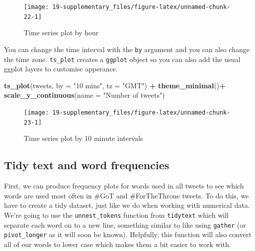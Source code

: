\documentclass[]{book}
\newenvironment{Shaded}{\begin{snugshade}}{\end{snugshade}}
\newcommand{\DataTypeTok}[1]{\textcolor[rgb]{0.13,0.29,0.53}{#1}}
\newcommand{\KeywordTok}[1]{\textcolor[rgb]{0.13,0.29,0.53}{\textbf{#1}}}
\newcommand{\NormalTok}[1]{#1}
\newcommand{\OperatorTok}[1]{\textcolor[rgb]{0.81,0.36,0.00}{\textbf{#1}}}
\newcommand{\StringTok}[1]{\textcolor[rgb]{0.31,0.60,0.02}{#1}}
\begin{document}
\begin{figure}

{\centering \texttt{[image: 19-supplementary\_files/figure-latex/unnamed-chunk-22-1]} 

}

\caption{Time series plot by hour}\label{fig:unnamed-chunk-22}
\end{figure}

You can change the time interval with the \texttt{by} argument and you can also change the time zone. \texttt{ts\_plot} creates a \texttt{ggplot} object so you can also add the usual ggplot layers to customise apperance.

\begin{Shaded}
\begin{Highlighting}[]
\KeywordTok{ts_plot}\NormalTok{(tweets, }\DataTypeTok{by =} \StringTok{"10 mins"}\NormalTok{, }\DataTypeTok{tz =} \StringTok{"GMT"}\NormalTok{) }\OperatorTok{+}
\StringTok{  }\KeywordTok{theme_minimal}\NormalTok{()}\OperatorTok{+}
\StringTok{  }\KeywordTok{scale_y_continuous}\NormalTok{(}\DataTypeTok{name =} \StringTok{"Number of tweets"}\NormalTok{)}
\end{Highlighting}
\end{Shaded}

\begin{figure}

{\centering \texttt{[image: 19-supplementary\_files/figure-latex/unnamed-chunk-23-1]} 

}

\caption{Time series plot by 10 minute intervals}\label{fig:unnamed-chunk-23}
\end{figure}

\hypertarget{tidy-text-and-word-frequencies}{%
\subsection{Tidy text and word frequencies}\label{tidy-text-and-word-frequencies}}

First, we can produce frequency plots for words used in all tweets to see which words are used most often in \#GoT and \#ForTheThrone tweets. To do this, we have to create a tidy dataset, just like we do when working with numerical data. We're going to use the \texttt{unnest\_tokens} function from \texttt{tidytext} which will separate each word on to a new line, something similar to like using \texttt{gather} (or \texttt{pivot\_longer} as it will soon be known). Helpfully, this function will also convert all of our words to lower case which makes them a bit easier to work with.
\end{document}
